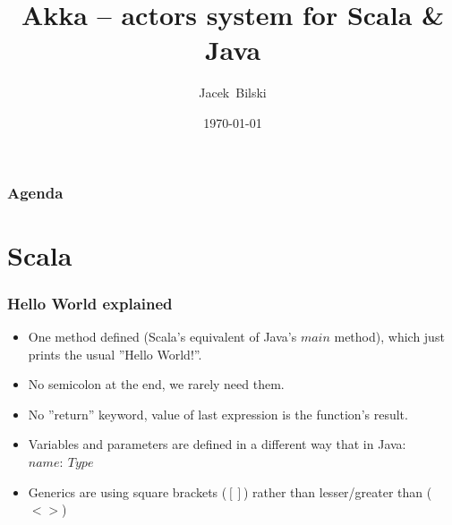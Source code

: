 \documentclass[xcolor=dvipsnames]{beamer}
\title{Akka -- actors system for Scala \& Java}
\author{Jacek~Bilski}
\date{\today}
\begin{document}
\begin{frame}
\titlepage
\end{frame}

\begin{frame}
\frametitle{Agenda}
\tableofcontents[pausesections]
\end{frame}

\section{Scala}


\begin{frame}
\frametitle{Hello World explained}
\begin{itemize}
\item One method defined (Scala's equivalent of Java's $main$ method), which just prints the usual ''Hello World!''.
\item No semicolon at the end, we rarely need them.
\item No ''return'' keyword, value of last expression is the function's result.
\item Variables and parameters are defined in a different way that in Java: $name:\:Type$
\item Generics are using square brackets ($[]$) rather than lesser/greater than ($<>$)
\end{itemize}
\end{frame}
\end{document}
